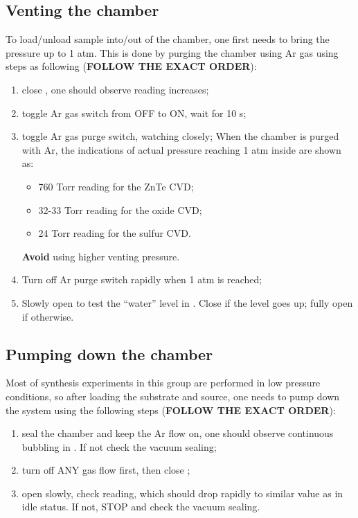 \subsection{Venting the chamber}
To load/unload sample into/out of the chamber, one first needs to bring the pressure up to 1 atm. This is done by purging the chamber using Ar gas using steps as following (\textbf{FOLLOW THE EXACT ORDER}):
\begin{enumerate}
\item close , one should observe  reading increases;
\item toggle Ar gas switch from OFF to ON, wait for 10 s;
\item toggle Ar gas purge switch, watching  closely; When the chamber is purged with Ar, the indications of actual pressure reaching 1 atm inside are shown as: 
\begin{itemize}
\item 760 Torr reading for the ZnTe CVD;
\item 32-33 Torr reading for the oxide CVD;
\item 24 Torr reading for the sulfur CVD. 
\end{itemize} \textbf{Avoid} using higher venting pressure. 
\item Turn off Ar purge switch rapidly when 1 atm is reached; 
\item Slowly open  to test the ``water'' level in . Close  if the level goes up; fully open  if otherwise. 
\end{enumerate}

\subsection{Pumping down the chamber}
Most of synthesis experiments in this group are performed in low pressure conditions, so after loading the substrate and source, one needs to pump down the system using the following steps (\textbf{FOLLOW THE EXACT ORDER}):
\begin{enumerate}
\item seal the chamber and keep the Ar flow on, one should observe continuous bubbling in . If not check the vacuum sealing;
\item turn off ANY gas flow first, then close ;
\item open  slowly, check  reading, which should drop rapidly to similar value as in idle status. If not, STOP and check the vacuum sealing.  
\end{enumerate}

